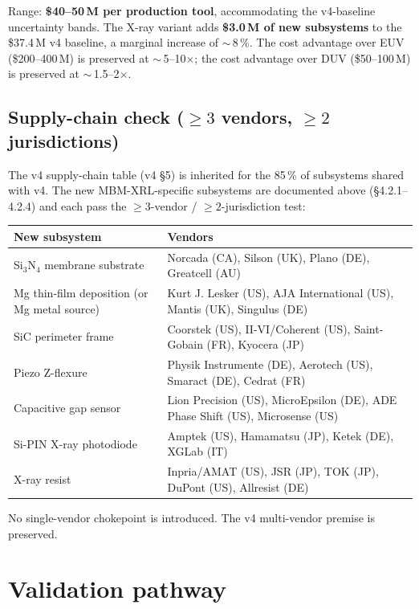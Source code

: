 \documentclass[11pt,letterpaper]{article}
\begin{document}
Range: \textbf{\$40--50\,M per production tool}, accommodating the v4-baseline uncertainty bands. The X-ray variant adds \textbf{\$3.0\,M of new subsystems} to the \$37.4\,M v4 baseline, a marginal increase of $\sim$\,8\,\%. The cost advantage over EUV (\$200--400\,M) is preserved at $\sim$\,5--10$\times$; the cost advantage over DUV (\$50--100\,M) is preserved at $\sim$\,1.5--2$\times$.

\subsection{Supply-chain check ($\geq 3$ vendors, $\geq 2$ jurisdictions)}

The v4 supply-chain table (v4 \S 5) is inherited for the 85\,\% of subsystems shared with v4. The new MBM-XRL-specific subsystems are documented above (\S 4.2.1--4.2.4) and each pass the $\geq 3$-vendor / $\geq 2$-jurisdiction test:

\begin{center}
\begin{tabular}{ll}
\toprule
New subsystem & Vendors \\
\midrule
Si$_3$N$_4$ membrane substrate & Norcada (CA), Silson (UK), Plano (DE), Greatcell (AU) \\
Mg thin-film deposition (or Mg metal source) & Kurt J. Lesker (US), AJA International (US), Mantis (UK), Singulus (DE) \\
SiC perimeter frame & Coorstek (US), II-VI/Coherent (US), Saint-Gobain (FR), Kyocera (JP) \\
Piezo Z-flexure & Physik Instrumente (DE), Aerotech (US), Smaract (DE), Cedrat (FR) \\
Capacitive gap sensor & Lion Precision (US), MicroEpsilon (DE), ADE Phase Shift (US), Microsense (US) \\
Si-PIN X-ray photodiode & Amptek (US), Hamamatsu (JP), Ketek (DE), XGLab (IT) \\
X-ray resist & Inpria/AMAT (US), JSR (JP), TOK (JP), DuPont (US), Allresist (DE) \\
\bottomrule
\end{tabular}
\end{center}

No single-vendor chokepoint is introduced. The v4 multi-vendor premise is preserved.

\section{Validation pathway}
\end{document}
